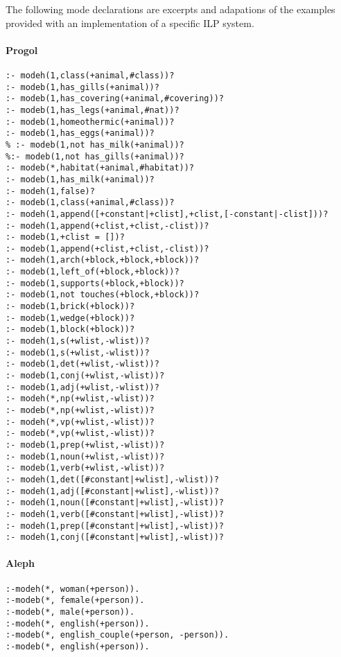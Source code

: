 The following mode declarations are excerpts and adapations of the examples provided with an implementation of a specific ILP system.

\paragraph{Progol}
\begin{lstlisting}
:- modeh(1,class(+animal,#class))?
:- modeb(1,has_gills(+animal))?
:- modeb(1,has_covering(+animal,#covering))?
:- modeb(1,has_legs(+animal,#nat))?
:- modeb(1,homeothermic(+animal))?
:- modeb(1,has_eggs(+animal))?
% :- modeb(1,not has_milk(+animal))?
%:- modeb(1,not has_gills(+animal))?
:- modeb(*,habitat(+animal,#habitat))?
:- modeb(1,has_milk(+animal))?
:- modeh(1,false)?
:- modeb(1,class(+animal,#class))?
:- modeh(1,append([+constant|+clist],+clist,[-constant|-clist]))?
:- modeh(1,append(+clist,+clist,-clist))?
:- modeb(1,+clist = [])?
:- modeb(1,append(+clist,+clist,-clist))?
:- modeh(1,arch(+block,+block,+block))?
:- modeb(1,left_of(+block,+block))?
:- modeb(1,supports(+block,+block))?
:- modeb(1,not touches(+block,+block))?
:- modeb(1,brick(+block))?
:- modeb(1,wedge(+block))?
:- modeb(1,block(+block))?
:- modeh(1,s(+wlist,-wlist))?
:- modeb(1,s(+wlist,-wlist))?
:- modeb(1,det(+wlist,-wlist))?
:- modeb(1,conj(+wlist,-wlist))?
:- modeb(1,adj(+wlist,-wlist))?
:- modeh(*,np(+wlist,-wlist))?
:- modeb(*,np(+wlist,-wlist))?
:- modeh(*,vp(+wlist,-wlist))?
:- modeb(*,vp(+wlist,-wlist))?
:- modeb(1,prep(+wlist,-wlist))?
:- modeb(1,noun(+wlist,-wlist))?
:- modeb(1,verb(+wlist,-wlist))?
:- modeh(1,det([#constant|+wlist],-wlist))?
:- modeh(1,adj([#constant|+wlist],-wlist))?
:- modeh(1,noun([#constant|+wlist],-wlist))?
:- modeh(1,verb([#constant|+wlist],-wlist))?
:- modeh(1,prep([#constant|+wlist],-wlist))?
:- modeh(1,conj([#constant|+wlist],-wlist))?
\end{lstlisting}

\paragraph{Aleph}
\begin{lstlisting}
:-modeh(*, woman(+person)).
:-modeb(*, female(+person)).
:-modeb(*, male(+person)).
:-modeh(*, english(+person)).
:-modeb(*, english_couple(+person, -person)).
:-modeb(*, english(+person)).

\end{lstlisting}

